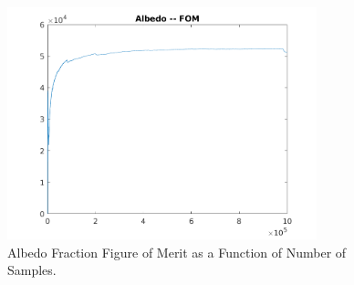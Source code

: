 \documentclass{article}
\begin{document}
  \begin{figure}
    \centering
    \includegraphics[width=0.8\textwidth]{albedo_fom}
    \caption{Albedo Fraction Figure of Merit as a Function of Number of 
      Samples.}
    \label{fig:albedo_fom}
  \end{figure}
\end{document}
